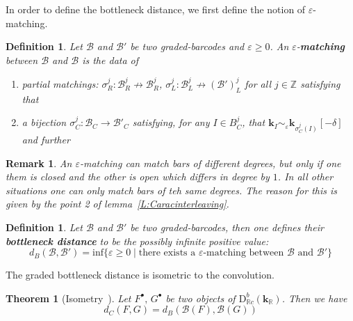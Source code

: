 \documentclass[a4paper, english, 11pt]{article}
\newcommand{\kk}[0]{\textbf{k}}
\newcommand{\0}{\vec{0}}
\newcommand{\R}[0]{\mathbb{R}}
\newcommand{\Z}[0]{\mathbb{Z}}
\newcommand{\B}[0]{\mathcal{B}}
\newcommand{\D}[0]{\text{D}}
\newtheorem{remark}[prop]{Remark}
\newtheorem{defi}[prop]{Definition}
\newtheorem{thm}[prop]{Theorem}
\begin{document}
 In order to define the bottleneck distance, we first define the notion of $\varepsilon$-matching. 
 
\begin{defi}\label{D:Epsilonmatching}
Let $\B$ and $\B'$ be two graded-barcodes and $\varepsilon \geq 0$. An $\varepsilon$-\textbf{matching} between $\B$ and $\B$ is the data of
\begin{enumerate}
\item partial matchings: $\sigma_R^j: \B^j_R \not \to \B_R^j$, $\sigma_L^j: \B^j_L \not \to (\B')_L^j$ for all $j\in \Z$
satisfying that 
\item a \emph{bijection} $\sigma^j_C :  \B_C \longrightarrow \B'_C$ satisfying,  for any $I \in B^j_C $, that  $\kk_I \sim_\varepsilon \kk_{\sigma^j_C(I)}[-\delta]$ and further 
\end{enumerate}
\end{defi}
\begin{remark}
 An $\varepsilon$-matching can match bars of different degrees, but only if one them is closed and the other is open which differs in degree by $1$. In all other situations one can only match bars of teh same degrees. The reason for this is given by the point 2 of lemma~\ref{L:Caracinterleaving}.
\end{remark}

\begin{defi}
Let $\B$ and $\B'$ be two graded-barcodes, then one defines their \textbf{bottleneck distance} to be the possibly infinite positive value: $$d_B(\B,\B') = \text{inf} \{\varepsilon \geq 0 \mid \text{there exists a } \varepsilon  \text{-matching between } \B \text{ and } \B' \} $$
\end{defi}
The graded bottleneck distance is isometric to the convolution.
\begin{thm}[Isometry~\cite{Berk18}]\label{T:DerivedIsometry}
Let $F^\bullet,\, G^\bullet$ be two objects of $\D^b_{\R c}(\kk_\R)$. Then we have 
$$ d_C(F,G) =  d_B(\B(F),\B(G))$$
\end{thm} 
\end{document}
